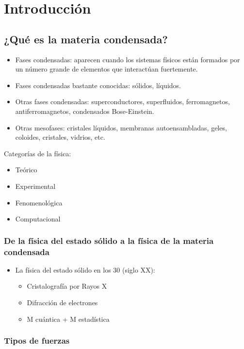 \chapter{Introducción}

\section{¿Qué es la materia condensada?}

\begin{itemize}
    \item Fases condensadas: aparecen cuando los sistemas f\'isicos est\'an formados por un n\'umero grande de elementos que interact\'uan fuertemente.
    \item Fases condensadas bastante conocidas: s\'olidos, l\'iquidos.
    \item Otras fases condensadas: superconductores, superfluidos, ferromagnetos, antiferromagnetos, condensados Bose-Einstein.
    \item Otras mesofases: cristales líquidos, membranas autoensambladas, geles, coloides, cristales, vidrios, etc.
\end{itemize}

Categorías de la física:
\begin{itemize}
    \item Teórico
    \item Experimental
    \item Fenomenológica
    \item Computacional
\end{itemize}

\subsection{De la física del estado sólido a la física de la materia condensada}

\begin{itemize}
    \item La física del estado sólido en los 30 (siglo XX):
    \begin{itemize}
        \item Cristalografía por Rayos X
        \item Difracción de electrones
        \item M cuántica + M estadística
    \end{itemize}
\end{itemize}

\subsection{Tipos de fuerzas}


